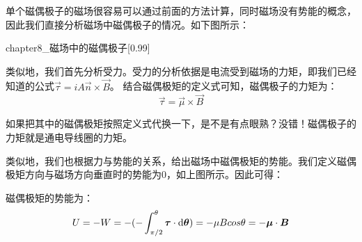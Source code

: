 单个磁偶极子的磁场很容易可以通过前面的方法计算，同时磁场没有势能的概念，因此我们直接分析磁场中磁偶极子的情况。如下图所示：
\begin{singlefigure}[磁场中的磁偶极子]{chapter8_磁场中的磁偶极子}[0.99]
\end{singlefigure}

类似地，我们首先分析受力。受力的分析依据是电流受到磁场的力矩，即我们已经知道的公式$\vec{\tau}=iA\vec{n}\times\vec{B}$。
结合磁偶极矩的定义式可知，磁偶极子的力矩为：
\[\vec{\tau}=\vec{\mu}\times\vec{B}\]

如果把其中的磁偶极矩按照定义式代换一下，是不是有点眼熟？没错！磁偶极子的力矩就是通电导线圈的力矩。

类似地，我们也根据力与势能的关系，给出磁场中磁偶极矩的势能。我们定义磁偶极矩方向与磁场方向垂直时的势能为0，如上图所示。因此可得：
\begin{law}
    磁偶极矩的势能为：
    \[U=-W=-(-\int_{\pi /2}^{\theta}\vec{\tau}\cdot \dif{\vec{\theta}})=-\mu Bcos\theta=-\vec{\mu}\cdot\vec{B}\]
\end{law}





